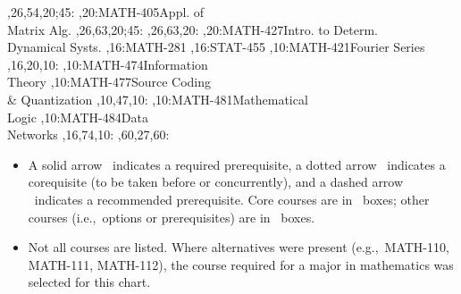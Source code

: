 \documentclass[9pt]{extarticle}
\begin{document}
\begin{chart}
  ,26,54,20;45:
,20:{MATH-405}{Appl. of\\Matrix Alg.}{}
  ,26,63,20;45:
  ,26,63,20:
,20:{MATH-427}{Intro. to Determ.\\Dynamical Systs.}{}
,16:{MATH-281}
,16:{STAT-455}
,10:{MATH-421}{Fourier Series}{}
  ,16,20,10:
,10:{MATH-474}{Information\\Theory}{}
,10:{MATH-477}{Source Coding\\\& Quantization}{}
  ,10,47,10:
,10:{MATH-481}{Mathematical\\Logic}{}
,10:{MATH-484}{Data\\Networks}{}
  ,16,74,10:
  ,60,27,60:
\end{chart}
\begin{center}
\begin{minipage}{6.0in}
\begin{itemize}
\item
A solid arrow \solidarrow\  indicates a required prerequisite,
a dotted arrow \dottedarrow\
indicates a corequisite (to be taken before or concurrently), and a
dashed arrow \dashedarrow\ indicates a recommended prerequisite.
Core courses are in \boldbox\ boxes;
other courses (i.e.,~options or prerequisites)
are in \lightbox\ boxes.
\item Not all courses are listed. Where alternatives were present
(e.g.,~MATH-110, MATH-111, MATH-112), the course required for a major in
mathematics was selected for this chart.
\end{itemize}
\end{minipage}
\end{center}
\end{document}
